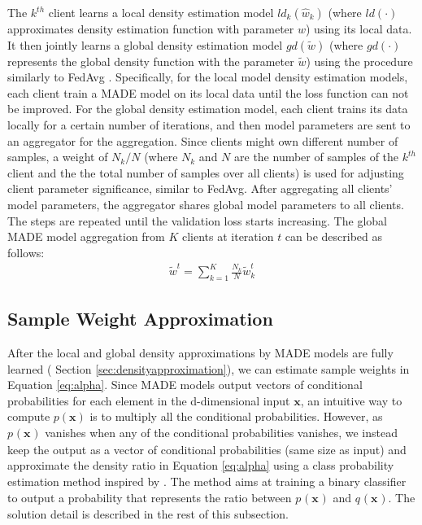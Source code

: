 \documentclass[journal]{IEEEtai}
\newcommand{\px}[2]{p_{#1}(\mathbf{x_{#2}})}
\newcommand{\qx}[2]{q_{#1}(\mathbf{x_{#2}})}
\begin{document}
The $k^{th}$ client learns a local density estimation model $ld_k(\hat{w}_k)$ (where $ld(\cdot)$ approximates density estimation function with parameter $\hat{w}$) using its local data. It then jointly learns a global density estimation model $gd(\tilde{w})$ (where $gd(\cdot)$ represents the global density function with the parameter $\tilde{w}$) using the procedure similarly to FedAvg \cite{OriginFL}. Specifically, for the local model density estimation models, each client train a MADE model on its local data until the loss function can not be improved. For the global density estimation model, each client trains its data locally for a certain number of iterations, and then model parameters are sent to an aggregator for the aggregation. Since clients might own different number of samples, a weight of ${N_k}/N$ (where $N_k$ and $N$ are the number of samples of the $k^{th}$ client and the the total number of samples over all clients) is used for adjusting client parameter significance, similar to FedAvg. After aggregating all clients' model parameters, the aggregator shares global model parameters to all clients. The steps are repeated until the validation loss starts increasing. The global MADE model aggregation from $K$ clients at iteration $t$ can be described as follows:
\begin{equation}
\begin{aligned}
 \tilde{w}^t = \sum_{k=1}^{K} \frac{N_k}{N} \tilde{w}^t_k 
\end{aligned}
\end{equation}

\subsection{Sample Weight Approximation}
\label{sec:weightapproximation}
After the local and global density approximations by MADE models are fully learned ( Section \ref{sec:densityapproximation}), we can estimate sample weights in Equation \ref{eq:alpha}. Since MADE models output vectors of conditional probabilities for each element in the d-dimensional input $\mathbf{x}$, an intuitive way to compute $p(\mathbf{x})$ is to multiply all the conditional probabilities. However, as $\px{}{}$ vanishes when any of the conditional probabilities vanishes, we instead keep the output as a vector of conditional probabilities (same size as input) and approximate the density ratio in Equation \ref{eq:alpha} using a class probability estimation method inspired by \cite{densityratio}. The method aims at training a binary classifier to output a probability that represents the ratio between $\px{}{}$ and $\qx{}{}$. The solution detail is described in the rest of this subsection. 
\end{document}
